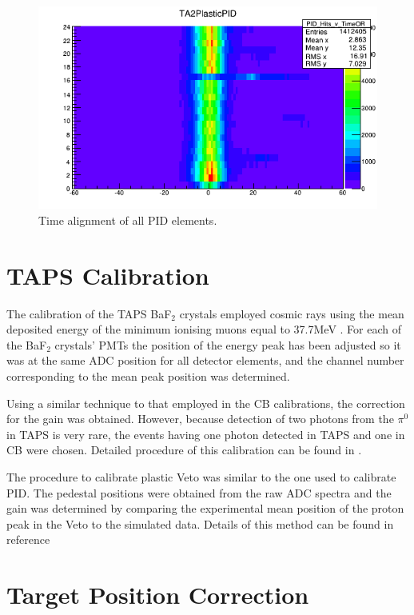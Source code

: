 \begin{figure}[H]
\begin{center}
\includegraphics[scale=0.55]{pictures/png/pidtdcoffset.png}
\caption{Time alignment of all PID elements.}
\label{pidtdcoffset}
\end{center}
\end{figure}

\section{TAPS Calibration}

\indent The calibration of the TAPS BaF$_{2}$ crystals employed cosmic rays using the mean deposited energy of the minimum ionising muons equal to 37.7MeV \cite{roebig}. For each of the BaF$_{2}$ crystals' PMTs the position of the energy peak has been adjusted so it was at the same ADC position for all detector elements, and the channel number corresponding to the mean peak position was determined.

\indent Using a similar technique to that employed in the CB calibrations, the correction for the gain was obtained. However, because detection of two photons from the $\pi^{0}$ in TAPS is very rare, the events having one photon detected in TAPS and one in CB were chosen. Detailed procedure of this calibration can be found in \cite{lemmer}.

\indent The procedure to calibrate plastic Veto was similar to the one used to calibrate PID. The pedestal positions were obtained from the raw ADC spectra and the gain was determined by comparing the experimental mean position of the proton peak in the Veto to the simulated data. Details of this method can be found in reference \cite{gessler}

\section{Target Position Correction}


   


